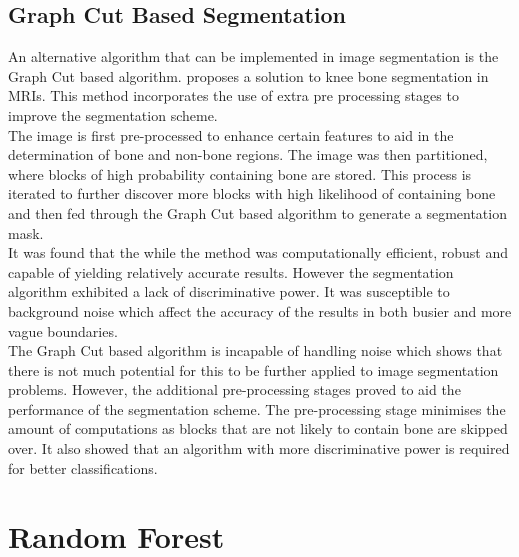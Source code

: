 \subsection{Graph Cut Based Segmentation}
An alternative algorithm that can be implemented in image segmentation is the Graph Cut based algorithm. \cite{ref:abab2011} proposes a solution to knee bone segmentation in MRIs. This method incorporates the use of extra pre processing stages to improve the segmentation scheme.
\\[1\baselineskip]
The image is first pre-processed to enhance certain features to aid in the determination of bone and non-bone regions. The image was then partitioned, where blocks of high probability containing bone are stored. This process is iterated to further discover more blocks with high likelihood of containing bone and then fed through the Graph Cut based algorithm to generate a segmentation mask.
\\[1\baselineskip]
It was found that the while the method was computationally efficient, robust and capable of yielding relatively accurate results. However the segmentation algorithm exhibited a lack of discriminative power. It was susceptible to background noise which affect the accuracy of the results in both busier and more vague boundaries. 
\\[1\baselineskip]
The Graph Cut based algorithm is incapable of handling noise which shows that there is not much potential for this to be further applied to image segmentation problems. However, the additional pre-processing stages proved to aid the performance of the segmentation scheme. The pre-processing stage minimises the amount of computations as blocks that are not likely to contain bone are skipped over. It also showed that an algorithm with more discriminative power is required for better classifications.

\section{Random Forest}
\label{lit:imgsegRF}
